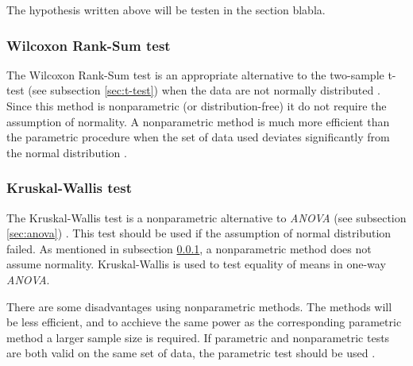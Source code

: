 The hypothesis written above will be testen in the section blabla. %



\subsubsection[Wilcoxon]{Wilcoxon Rank-Sum test}\label{sec:Wilcoxon}
The Wilcoxon Rank-Sum test is an appropriate alternative to the two-sample t-test (see subsection \ref{sec:t-test}) when the data are not normally distributed \citep{Walpole2012}. Since this method is nonparametric (or distribution-free) it do not require the assumption of normality. A nonparametric method is much more efficient than the parametric procedure when the set of data used deviates significantly from the normal distribution \citep{Walpole2012}. 

\subsubsection[Kruskal]{Kruskal-Wallis test}
The Kruskal-Wallis test is a nonparametric alternative to \textit{ANOVA} (see subsection \ref{sec:anova})  \citep{Walpole2012}. This test should be used if the assumption of normal distribution failed. As mentioned in subsection \ref{sec:Wilcoxon}, a nonparametric method does not assume normality. Kruskal-Wallis is used to test equality of means in one-way \textit{ANOVA}. 

There are some disadvantages using nonparametric methods. The methods will be less efficient, and to acchieve the same power as the corresponding parametric method a larger sample size is required. If parametric and nonparametric tests are both valid on the same set of data, the parametric test should be used \citep{Walpole2012}. 

